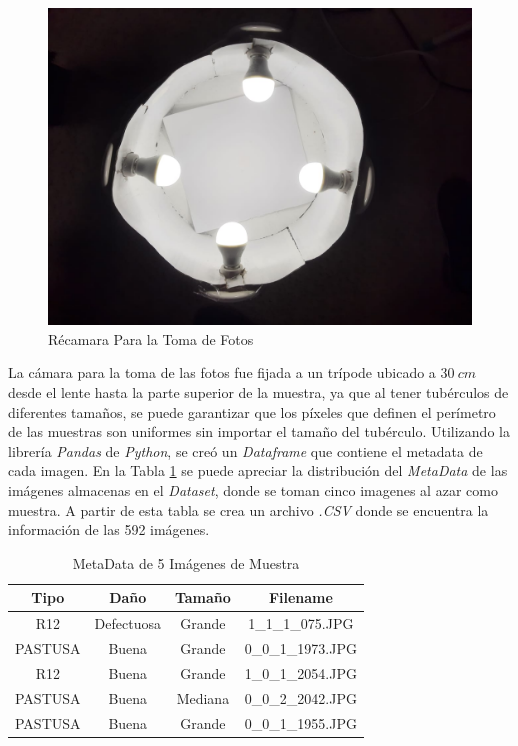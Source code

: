 \begin{figure}[ht]
	\centering
	\includegraphics[scale=0.16]{Figs/Chamber.JPEG}
	\caption{Récamara Para la Toma de Fotos}
	\label{fig:chamber}
\end{figure}


La cámara para la toma de las fotos fue fijada a un trípode ubicado a $30 \ cm$ desde el lente hasta la parte superior de la muestra, ya que al tener tubérculos de diferentes tamaños, se puede garantizar que los píxeles que definen el perímetro de las muestras son uniformes sin importar el tamaño del tubérculo. Utilizando la librería \textit{Pandas} de \textit{Python}, se creó un \textit{Dataframe} que contiene el metadata de cada imagen. En la Tabla \ref{table:metadata} se puede apreciar la distribución del \textit{MetaData} de las imágenes almacenas en el \textit{Dataset}, donde se toman cinco imagenes al azar como muestra. A partir de esta tabla se crea un archivo \textit{.CSV} donde se encuentra la información de las 592 imágenes.\\

\begin{table}[ht]
	\centering
	\begin{tabular}{|c|c|c|c|}
		\hline
		Tipo & Daño & Tamaño & Filename \\
		\hline
		R12 & Defectuosa & Grande & 1\_1\_1\_075.JPG \\
		\hline
		PASTUSA & Buena & Grande & 0\_0\_1\_1973.JPG \\
		\hline
		R12 & Buena & Grande & 1\_0\_1\_2054.JPG \\
		\hline
		PASTUSA & Buena & Mediana & 0\_0\_2\_2042.JPG \\
		\hline
		PASTUSA & Buena & Grande & 0\_0\_1\_1955.JPG \\
		\hline
	\end{tabular}	
	\caption{MetaData de 5 Imágenes de Muestra}
	\label{table:metadata}
\end{table}


